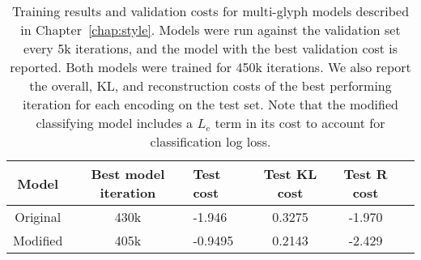 \begin{table}[h]
\centering
    \caption[Training results for the multi-class digit glyph models]{Training results and validation costs for multi-glyph models described in Chapter~\ref{chap:style}.
    Models were run against the validation set every 5k iterations, and the model with the best validation cost is reported.
    Both models were trained for 450k iterations.
    We also report the overall, KL, and reconstruction costs of the best performing iteration for each encoding on the test set.
    Note that the modified classifying model includes a $L_c$ term in its cost to account for classification log loss.
    \label{apptbl:train-style}}
\begin{tabularx}{\textwidth}{c c X c c c}
\toprule
    Model & Best model iteration & Test cost & Test KL cost & Test R cost \\ \midrule
    Original & 430k & -1.946 & 0.3275 & -1.970 \\
    Modified & 405k & -0.9495 & 0.2143 & -2.429 \\
\end{tabularx}
\end{table}

